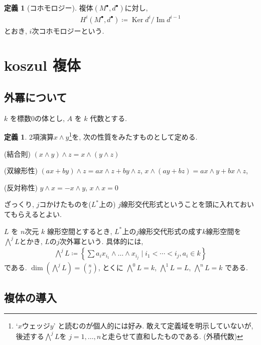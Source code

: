 \documentclass[11pt, a4paper, dvipdfmx]{jsarticle}
\theoremstyle{definition}
\newtheorem{Definition}[Axiom]{定義}
\newcommand{\Ker}{\mathop{\mathrm{Ker}}\nolimits}
\newcommand{\Img}{\mathop{\mathrm{Im}}\nolimits}
\newcommand{\dip}{\displaystyle} %
\numberwithin{equation}{section}
\begin{document}
\begin{Definition}[コホモロジー]
    複体$(M^\bullet,d^\bullet)$に対し, 
    \begin{align*}
        H^i(M^\bullet,d^\bullet) \coloneqq 
        \Ker d^{i} / \Img d^{i-1}
    \end{align*}
    とおき, $i$次コホモロジーという. 
\end{Definition}

\section{koszul 複体}

\subsection{外冪について}

$k$ を標数$0$の体とし, $A$ を $k$ 代数とする. 

\begin{Definition}
    2項演算$x\wedge y$\footnote{
        `$x$ウェッジ$y$' と読むのが個人的には好み. 
        敢えて定義域を明示していないが, 
        後述する$\bigwedge^j L$を
        $j= 1,\ldots,n$と走らせて直和したものである. 
        (外積代数)
    }を, 次の性質をみたすものとして定める. 
    
    (結合則) \quad 
    $(x\wedge y) \wedge z = x\wedge (y\wedge z)$

    (双線形性)\quad 
    $(ax + by)\wedge z = ax\wedge z + by\wedge z$, \quad
    $x \wedge (ay + bz) = ax\wedge y + bx\wedge z$,

    (反対称性) \quad
    $y\wedge x = - x\wedge y$, $x\wedge x = 0$
\end{Definition}

ざっくり, $j$コかけたものを($L^*$上の) 
$j$線形交代形式ということを頭に入れておいてもらえるとよい. 

$L$ を $n$次元 $k$ 線形空間とするとき, 
$L^*$上の$j$線形交代形式の成す$k$線形空間を
$\bigwedge^j L$とかき, $L$の$j$次外冪という. 
具体的には, 
\begin{align*}
    \bigwedge^j L \coloneqq 
    \left\{
        \sum a_ix_{i_1}\wedge \dots \wedge x_{i_j}
        \mid 
        i_1 < \cdots < i_j, a_i\in k
    \right\}
\end{align*}
である. 
$\dip \dim \left(\bigwedge^j L \right) = \binom{n}{j}$, 
とくに
$\bigwedge^0 L = k$, 
$\bigwedge^1 L = L$, 
$\bigwedge^n L = k$
である. 


\subsection{複体の導入}
\end{document}
